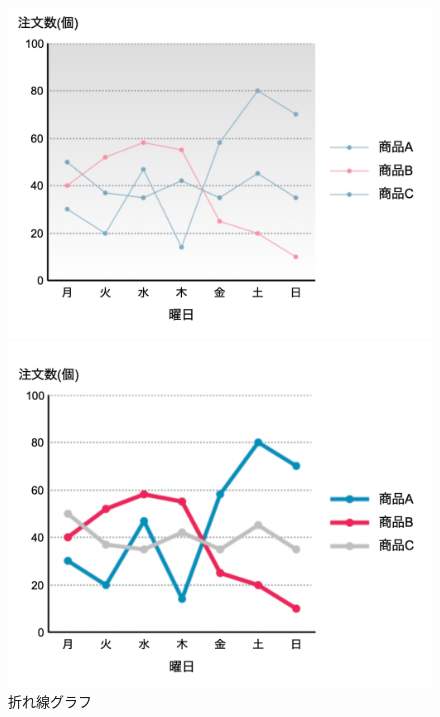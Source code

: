 \begin{figure}[H]
\begin{minipage}[b]{.49\columnwidth}
        \includegraphics[keepaspectratio,width=\textwidth]{../../10_UniversalDesign/no2_line_CC_T.png}
    \end{minipage}
    \begin{minipage}[b]{.49\columnwidth}
        \centering
        \includegraphics[keepaspectratio,width=\textwidth]{../../10_UniversalDesign/no2_line_RC_T.png}
    \end{minipage}
    \caption{折れ線グラフ}
\end{figure}
